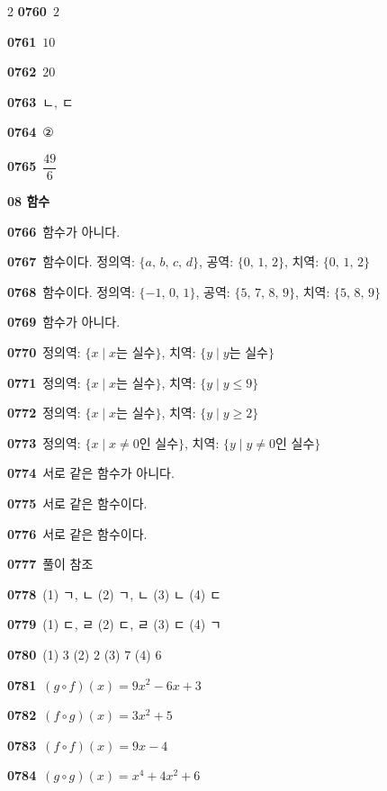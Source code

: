 \documentclass[10pt,a4paper]{article}
\begin{document}
\begin{multicols}{2}
\noindent\textbf{0760}\ $2$\par
\noindent\textbf{0761}\ $10$\par
\noindent\textbf{0762}\ $20$\par
\noindent\textbf{0763}\ ㄴ, ㄷ\par
\noindent\textbf{0764}\ ②\par
\noindent\textbf{0765}\ $\dfrac{49}{6}$\par
\noindent\textbf{08 함수}\par\smallskip
\noindent\textbf{0766}\ 함수가 아니다.\par
\noindent\textbf{0767}\ 함수이다. 정의역: $\{a,\,b,\,c,\,d\}$, 공역: $\{0,\,1,\,2\}$, 치역: $\{0,\,1,\,2\}$\par
\noindent\textbf{0768}\ 함수이다. 정의역: $\{-1,\,0,\,1\}$, 공역: $\{5,\,7,\,8,\,9\}$, 치역: $\{5,\,8,\,9\}$\par
\noindent\textbf{0769}\ 함수가 아니다.\par
\noindent\textbf{0770}\ 정의역: $\{x \mid x$는 실수$\}$, 치역: $\{y \mid y$는 실수$\}$\par
\noindent\textbf{0771}\ 정의역: $\{x \mid x$는 실수$\}$, 치역: $\{y \mid y\le 9\}$\par
\noindent\textbf{0772}\ 정의역: $\{x \mid x$는 실수$\}$, 치역: $\{y \mid y\ge 2\}$\par
\noindent\textbf{0773}\ 정의역: $\{x \mid x\ne 0$인 실수$\}$, 치역: $\{y \mid y\ne 0$인 실수$\}$\par
\noindent\textbf{0774}\ 서로 같은 함수가 아니다.\par
\noindent\textbf{0775}\ 서로 같은 함수이다.\par
\noindent\textbf{0776}\ 서로 같은 함수이다.\par
\noindent\textbf{0777}\ 풀이 참조\par
\noindent\textbf{0778}\ (1) ㄱ, ㄴ \quad (2) ㄱ, ㄴ \quad (3) ㄴ \quad (4) ㄷ\par
\noindent\textbf{0779}\ (1) ㄷ, ㄹ \quad (2) ㄷ, ㄹ \quad (3) ㄷ \quad (4) ㄱ\par
\noindent\textbf{0780}\ (1) $3$ \quad (2) $2$ \quad (3) $7$ \quad (4) $6$\par
\noindent\textbf{0781}\ $(g\circ f)(x)=9x^2-6x+3$\par
\noindent\textbf{0782}\ $(f\circ g)(x)=3x^2+5$\par
\noindent\textbf{0783}\ $(f\circ f)(x)=9x-4$\par
\noindent\textbf{0784}\ $(g\circ g)(x)=x^4+4x^2+6$\par

\end{multicols}
\end{document}
